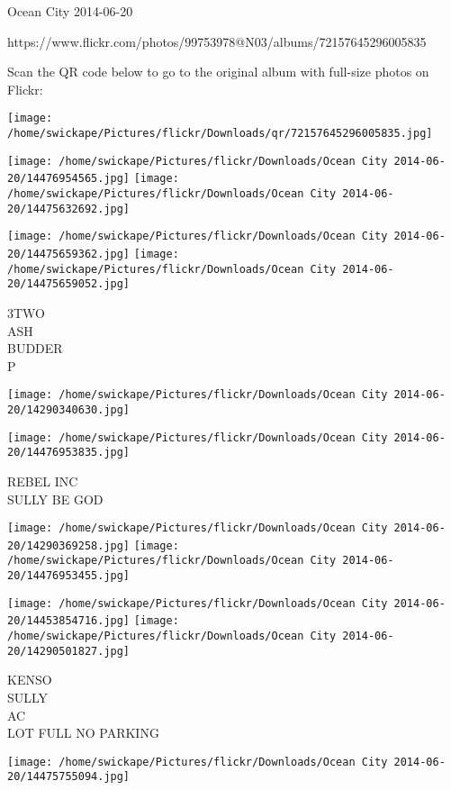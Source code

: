 \documentclass[10pt,letterpaper]{article}
\begin{document}
Ocean City 2014-06-20

https://www.flickr.com/photos/99753978@N03/albums/72157645296005835

Scan the QR code below to go to the original album with full-size photos on Flickr:

\texttt{[image: /home/swickape/Pictures/flickr/Downloads/qr/72157645296005835.jpg]}
\pagebreak

\texttt{[image: /home/swickape/Pictures/flickr/Downloads/Ocean City 2014-06-20/14476954565.jpg]}
\texttt{[image: /home/swickape/Pictures/flickr/Downloads/Ocean City 2014-06-20/14475632692.jpg]}

\texttt{[image: /home/swickape/Pictures/flickr/Downloads/Ocean City 2014-06-20/14475659362.jpg]}
\texttt{[image: /home/swickape/Pictures/flickr/Downloads/Ocean City 2014-06-20/14475659052.jpg]}

3TWO\\
ASH\\
BUDDER\\
P\\
\pagebreak

\texttt{[image: /home/swickape/Pictures/flickr/Downloads/Ocean City 2014-06-20/14290340630.jpg]}

\vspace{0.25in}
\texttt{[image: /home/swickape/Pictures/flickr/Downloads/Ocean City 2014-06-20/14476953835.jpg]}

REBEL INC\\
SULLY BE GOD\\
\pagebreak

\texttt{[image: /home/swickape/Pictures/flickr/Downloads/Ocean City 2014-06-20/14290369258.jpg]}
\texttt{[image: /home/swickape/Pictures/flickr/Downloads/Ocean City 2014-06-20/14476953455.jpg]}

\texttt{[image: /home/swickape/Pictures/flickr/Downloads/Ocean City 2014-06-20/14453854716.jpg]}
\texttt{[image: /home/swickape/Pictures/flickr/Downloads/Ocean City 2014-06-20/14290501827.jpg]}

KENSO\\
SULLY\\
AC\\
LOT FULL NO PARKING\\
\pagebreak

\texttt{[image: /home/swickape/Pictures/flickr/Downloads/Ocean City 2014-06-20/14475755094.jpg]}
\end{document}
